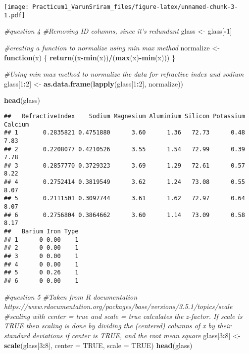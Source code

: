 \documentclass[]{article}
\newenvironment{Shaded}{\begin{snugshade}}{\end{snugshade}}
\newcommand{\KeywordTok}[1]{\textcolor[rgb]{0.13,0.29,0.53}{\textbf{#1}}}
\newcommand{\DataTypeTok}[1]{\textcolor[rgb]{0.13,0.29,0.53}{#1}}
\newcommand{\DecValTok}[1]{\textcolor[rgb]{0.00,0.00,0.81}{#1}}
\newcommand{\StringTok}[1]{\textcolor[rgb]{0.31,0.60,0.02}{#1}}
\newcommand{\CommentTok}[1]{\textcolor[rgb]{0.56,0.35,0.01}{\textit{#1}}}
\newcommand{\OtherTok}[1]{\textcolor[rgb]{0.56,0.35,0.01}{#1}}
\newcommand{\ControlFlowTok}[1]{\textcolor[rgb]{0.13,0.29,0.53}{\textbf{#1}}}
\newcommand{\OperatorTok}[1]{\textcolor[rgb]{0.81,0.36,0.00}{\textbf{#1}}}
\newcommand{\NormalTok}[1]{#1}
\begin{document}
\texttt{[image: Practicum1\_VarunSriram\_files/figure-latex/unnamed-chunk-3-1.pdf]}

\begin{Shaded}
\begin{Highlighting}[]
\CommentTok{#question 4}
\CommentTok{#Removing ID columns, since it's redundant}
\NormalTok{glass <-}\StringTok{ }\NormalTok{glass[}\OperatorTok{-}\DecValTok{1}\NormalTok{]}

\CommentTok{#creating a function to normalize using min max method}
\NormalTok{normalize <-}\StringTok{ }\ControlFlowTok{function}\NormalTok{(x)}
\NormalTok{\{}
  \KeywordTok{return}\NormalTok{((x}\OperatorTok{-}\KeywordTok{min}\NormalTok{(x))}\OperatorTok{/}\NormalTok{(}\KeywordTok{max}\NormalTok{(x)}\OperatorTok{-}\KeywordTok{min}\NormalTok{(x)))}
\NormalTok{\}}

\CommentTok{#Using min max method to normalize the data for refractive index and sodium}
\NormalTok{glass[}\DecValTok{1}\OperatorTok{:}\DecValTok{2}\NormalTok{] <-}\StringTok{ }\KeywordTok{as.data.frame}\NormalTok{(}\KeywordTok{lapply}\NormalTok{(glass[}\DecValTok{1}\OperatorTok{:}\DecValTok{2}\NormalTok{], normalize))}

\KeywordTok{head}\NormalTok{(glass)}
\end{Highlighting}
\end{Shaded}

\begin{verbatim}
##   RefractiveIndex    Sodium Magnesium Aluminium Silicon Potassium Calcium
## 1       0.2835821 0.4751880      3.60      1.36   72.73      0.48    7.83
## 2       0.2208077 0.4210526      3.55      1.54   72.99      0.39    7.78
## 3       0.2857770 0.3729323      3.69      1.29   72.61      0.57    8.22
## 4       0.2752414 0.3819549      3.62      1.24   73.08      0.55    8.07
## 5       0.2111501 0.3097744      3.61      1.62   72.97      0.64    8.07
## 6       0.2756804 0.3864662      3.60      1.14   73.09      0.58    8.17
##   Barium Iron Type
## 1      0 0.00    1
## 2      0 0.00    1
## 3      0 0.00    1
## 4      0 0.00    1
## 5      0 0.26    1
## 6      0 0.00    1
\end{verbatim}

\begin{Shaded}
\begin{Highlighting}[]
\CommentTok{#question 5}
\CommentTok{#Taken from R documentation https://www.rdocumentation.org/packages/base/versions/3.5.1/topics/scale }
\CommentTok{#scaling with center = true and scale = true  calculates the z-factor. If scale is TRUE then scaling is done by dividing the (centered) columns of x by their standard deviations if center is TRUE, and the root mean square }
\NormalTok{glass[}\DecValTok{3}\OperatorTok{:}\DecValTok{8}\NormalTok{] <-}\StringTok{ }\KeywordTok{scale}\NormalTok{(glass[}\DecValTok{3}\OperatorTok{:}\DecValTok{8}\NormalTok{], }\DataTypeTok{center =} \OtherTok{TRUE}\NormalTok{, }\DataTypeTok{scale =} \OtherTok{TRUE}\NormalTok{)}
\KeywordTok{head}\NormalTok{(glass)}
\end{Highlighting}
\end{Shaded}
\end{document}

